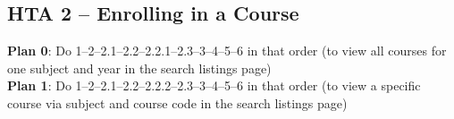 \documentclass[12pt]{article}
\begin{document}
\subsection{HTA 2 -- Enrolling in a Course}
\vspace{4mm}
\begin{center}
\end{center}

\textbf{Plan 0}: Do 1--2--2.1--2.2--2.2.1--2.3--3--4--5--6 in that order (to view all courses for one subject and year in the search listings page)\\

\textbf{Plan 1}: Do 1--2--2.1--2.2--2.2.2--2.3--3--4--5--6 in that order (to view a specific course via subject and course code in the search listings page)
\end{document}
